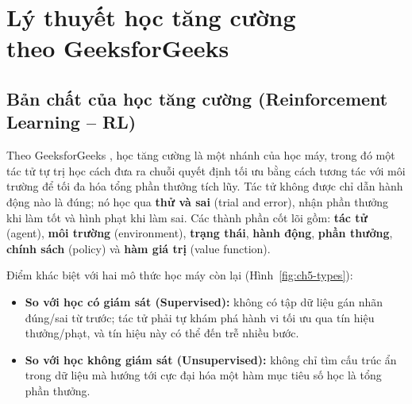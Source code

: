 \chapter[Lý thuyết học tăng cường theo GeeksforGeeks]{Lý thuyết học tăng cường\\theo GeeksforGeeks}

\section{Bản chất của học tăng cường (Reinforcement Learning -- RL)}
Theo GeeksforGeeks \cite{gfg_rl}, học tăng cường là một nhánh của học máy, trong đó một tác tử tự trị học cách đưa ra
chuỗi quyết định tối ưu bằng cách tương tác với môi trường để tối đa hóa tổng phần thưởng tích lũy. Tác tử không được chỉ
dẫn hành động nào là đúng; nó học qua \textbf{thử và sai} (trial and error), nhận phần thưởng khi làm tốt và hình phạt khi
làm sai. Các thành phần cốt lõi gồm: \textbf{tác tử} (agent), \textbf{môi trường} (environment), \textbf{trạng thái},
\textbf{hành động}, \textbf{phần thưởng}, \textbf{chính sách} (policy) và \textbf{hàm giá trị} (value function).

Điểm khác biệt với hai mô thức học máy còn lại (Hình~\ref{fig:ch5-types}):
\begin{itemize}
  \item \textbf{So với học có giám sát (Supervised):} không có tập dữ liệu gán nhãn đúng/sai từ trước; tác tử phải tự
        khám phá hành vi tối ưu qua tín hiệu thưởng/phạt, và tín hiệu này có thể đến trễ nhiều bước.
  \item \textbf{So với học không giám sát (Unsupervised):} không chỉ tìm cấu trúc ẩn trong dữ liệu mà hướng tới cực đại
        hóa một hàm mục tiêu số học là tổng phần thưởng.
\end{itemize}


